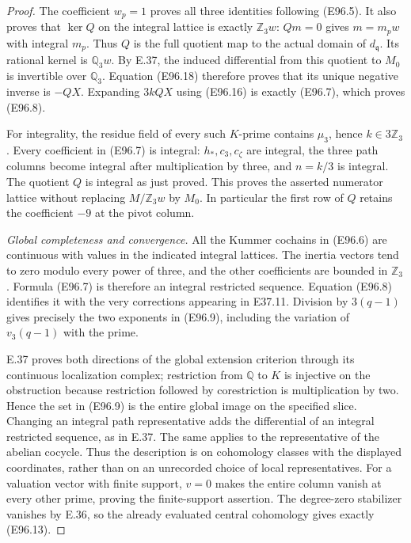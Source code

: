 \begin{proof}
The coefficient $w_p=1$ proves all three identities
following (E96.5). It also proves that $\ker Q$ on
the integral lattice is exactly $\mathbb Z_3w$:
$Qm=0$ gives $m=m_pw$ with integral $m_p$.
Thus $Q$ is the full quotient map to the actual
domain of $d_{\mathfrak q}$. Its rational kernel is
$\mathbb Q_3w$. By E.37, the induced differential
from this quotient to $M_0$ is invertible over
$\mathbb Q_3$. Equation (E96.18) therefore proves
that its unique negative inverse is $-QX$.
Expanding $3kQX$ using (E96.16) is exactly (E96.7),
which proves (E96.8).

For integrality, the residue field of every such
$K$-prime contains $\mu_3$, hence $k\in3\mathbb Z_3$.
Every coefficient in (E96.7) is integral:
$h_*,c_3,c_\zeta$ are integral, the three path columns
become integral after multiplication by three,
and $n=k/3$ is integral. The quotient $Q$ is integral
as just proved. This proves the asserted numerator
lattice without replacing $M/\mathbb Z_3w$ by $M_0$.
In particular the first row of $Q$ retains the
coefficient $-9$ at the pivot column.

\emph{Global completeness and convergence.}
All the Kummer cochains in (E96.6) are continuous
with values in the indicated integral lattices.
The inertia vectors tend to zero modulo every
power of three, and the other coefficients are
bounded in $\mathbb Z_3$. Formula (E96.7) is therefore
an integral restricted sequence. Equation (E96.8)
identifies it with the very corrections appearing
in E37.11. Division by $3(q-1)$ gives precisely the
two exponents in (E96.9), including the variation
of $v_3(q-1)$ with the prime.

E.37 proves both directions of the global extension
criterion through its continuous localization complex;
restriction from $\mathbb Q$ to $K$ is injective on
the obstruction because restriction followed by
corestriction is multiplication by two. Hence the
set in (E96.9) is the entire global image on the
specified slice. Changing an integral path representative
adds the differential of an integral restricted
sequence, as in E.37. The same applies to the
representative of the abelian cocycle. Thus the
description is on cohomology classes with the displayed
coordinates, rather than on an unrecorded choice of
local representatives. For a valuation vector with
finite support, $v=0$ makes the entire column vanish
at every other prime, proving the finite-support
assertion. The degree-zero stabilizer vanishes by
E.36, so the already evaluated central cohomology
gives exactly (E96.13).


\end{proof}
